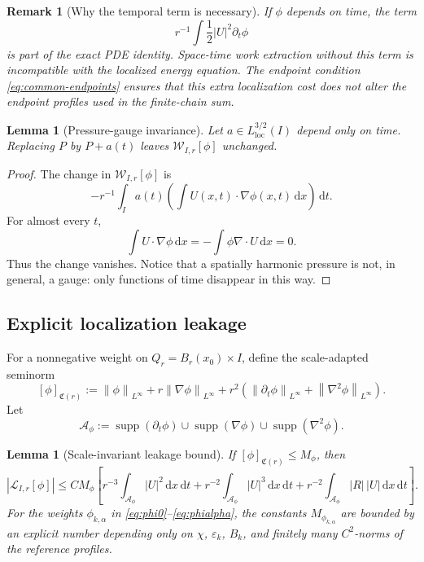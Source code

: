 \documentclass[11pt]{article}
\numberwithin{equation}{section}
\newtheorem{lemma}[theorem]{Lemma}
\newtheorem{remark}[theorem]{Remark}
\DeclareMathOperator{\supp}{supp}
\newcommand{\eps}{\varepsilon}
\newcommand{\dx}{\,\mathrm dx}
\newcommand{\dt}{\,\mathrm dt}
\newcommand{\dxdt}{\,\mathrm dx\,\mathrm dt}
\newcommand{\norm}[2]{\left\lVert #1\right\rVert_{#2}}
\newcommand{\W}{\mathcal W}
\newcommand{\Lk}{\mathcal L}
\begin{document}
\begin{remark}[Why the temporal term is necessary]
If \(\phi\) depends on time, the term
\[
r^{-1}\int\frac12|U|^2\partial_t\phi
\]
is part of the exact PDE identity. Space-time work extraction without this term is incompatible with the localized energy equation. The endpoint condition \eqref{eq:common-endpoints} ensures that this extra localization cost does not alter the endpoint profiles used in the finite-chain sum.
\end{remark}

\begin{lemma}[Pressure-gauge invariance]\label{lem:gauge}
Let \(a\in L^{3/2}_{\mathrm{loc}}(I)\) depend only on time. Replacing \(P\) by \(P+a(t)\) leaves \(\W_{I,r}[\phi]\) unchanged.
\end{lemma}

\begin{proof}
The change in \(\W_{I,r}[\phi]\) is
\[
-r^{-1}\int_I a(t)
\left(\int U(x,t)\cdot\nabla\phi(x,t)\dx\right)\dt.
\]
For almost every \(t\),
\[
\int U\cdot\nabla\phi\dx
=-\int\phi\nabla\cdot U\dx=0.
\]
Thus the change vanishes. Notice that a spatially harmonic pressure is not, in general, a gauge: only functions of time disappear in this way.
\end{proof}

\subsection{Explicit localization leakage}\label{sec:leakage}

For a nonnegative weight on \(Q_r=B_r(x_0)\times I\), define the scale-adapted seminorm
\begin{equation}\label{eq:phi-seminorm}
[\phi]_{\mathfrak C(r)}
:=
\norm{\phi}{L^\infty}
+
r\norm{\nabla\phi}{L^\infty}
+
r^2\left(
\norm{\partial_t\phi}{L^\infty}
+
\norm{\nabla^2\phi}{L^\infty}
\right).
\end{equation}
Let
\begin{equation}\label{eq:derivative-region}
\mathscr A_\phi
:=
\supp(\partial_t\phi)
\cup
\supp(\nabla\phi)
\cup
\supp(\nabla^2\phi).
\end{equation}

\begin{lemma}[Scale-invariant leakage bound]\label{lem:leakage}
If \([\phi]_{\mathfrak C(r)}\le M_\phi\), then
\begin{equation}\label{eq:leakage-bound}
\boxed{
|\Lk_{I,r}[\phi]|
\le
C M_\phi
\left[
 r^{-3}\int_{\mathscr A_\phi}|U|^2\dxdt
+
 r^{-2}\int_{\mathscr A_\phi}|U|^3\dxdt
+
 r^{-2}\int_{\mathscr A_\phi}|R|\,|U|\dxdt
\right].
}
\end{equation}
For the weights \(\phi_{k,\alpha}\) in \eqref{eq:phi0}--\eqref{eq:phialpha}, the constants \(M_{\phi_{k,\alpha}}\) are bounded by an explicit number depending only on \(\chi\), \(\eps_k\), \(B_k\), and finitely many \(C^2\)-norms of the reference profiles.
\end{lemma}
\end{document}
